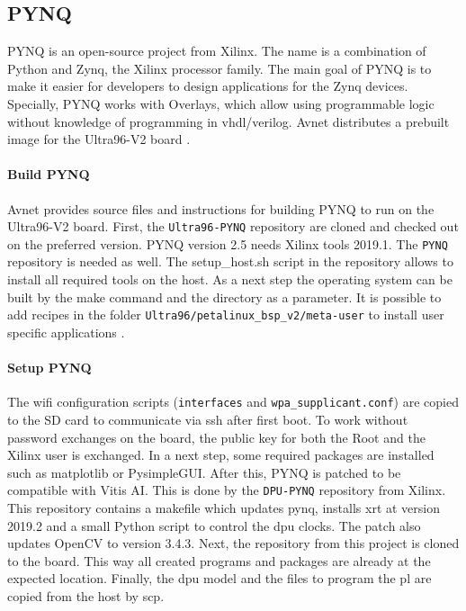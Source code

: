 \subsection{PYNQ}
\label{subsec:embedded_platform:operating_systems:pynq}

PYNQ is an open-source project from Xilinx.
The name is a combination of Python and Zynq, the Xilinx processor family.
The main goal of PYNQ is to make it easier for developers to design applications for the Zynq devices. 
Specially, PYNQ works with Overlays, which allow using programmable logic without knowledge of programming in vhdl/verilog.
Avnet distributes a prebuilt image for the Ultra96-V2 board \cite{pynq_intro}.

\paragraph{Build PYNQ}
Avnet provides source files and instructions for building PYNQ to run on the Ultra96-V2 board.
First, the \texttt{Ultra96-PYNQ} repository are cloned and checked out on the preferred version.
PYNQ version 2.5 needs Xilinx tools 2019.1.
The \texttt{PYNQ} repository is needed as well.
The setup\_host.sh script in the repository allows to install all required tools on the host.
As a next step the operating system can be built by the make command and the directory as a parameter.
It is possible to add recipes in the folder \texttt{Ultra96/petalinux\_bsp\_v2/meta-user} to install user specific applications \cite{avnet_pynq_github}. 

\paragraph{Setup PYNQ}
The wifi configuration scripts (\texttt{interfaces} and \texttt{wpa\_supplicant.conf}) are copied to the SD card to communicate via \acrfull{ssh} after first boot.
To work without password exchanges on the board, the public key for both the Root and the Xilinx user is exchanged.
In a next step, some required packages are installed such as matplotlib or PysimpleGUI.
After this, PYNQ is patched to be compatible with Vitis AI.
This is done by the \texttt{DPU-PYNQ} repository from Xilinx.
This repository contains a makefile which updates pynq, installs \acrfull{xrt} at version 2019.2 and a small Python script to control the \acrfull{dpu} clocks.
The patch also updates OpenCV to version 3.4.3.
Next, the repository from this project is cloned to the board.
This way all created programs and packages are already at the expected location.
Finally, the \acrshort{dpu} model and the files to program the \acrfull{pl} are copied from the host by \acrfull{scp}.

